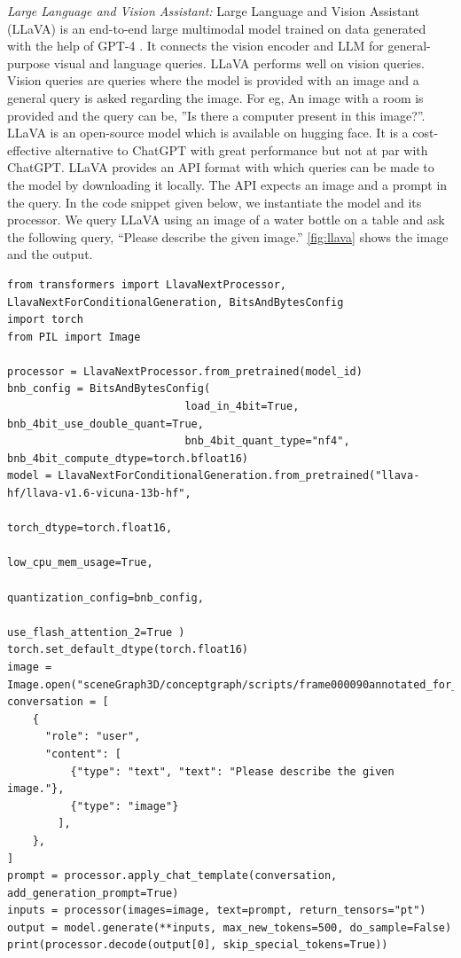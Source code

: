 \textit{Large Language and Vision Assistant:}
 Large Language and Vision Assistant (LLaVA) is an end-to-end large multimodal model trained on data generated with the help of GPT-4 \cite{liu2023visualinstructiontuning}. 
 It connects the vision encoder and LLM for general-purpose visual and language queries. LLaVA performs well on vision queries. 
 Vision queries are queries where the model is provided with an image and a general query is asked regarding the image. 
 For eg, An image with a room is provided and the query can be, ”Is there a computer present in this image?”. LLaVA is an open-source model which is available on
 hugging face. It is a cost-effective alternative to ChatGPT with great performance but not at par with ChatGPT. LLaVA provides an API format with which queries can be made
 to the model by downloading it locally. The API expects an image and a prompt in the query. In the code snippet given below, we instantiate the model and its processor. We
 query LLaVA using an image of a water bottle on a table and ask the following query, \enquote{Please describe the given image.} \cref{fig:llava} shows the image
 and the output.  
\begin{lstlisting}
from transformers import LlavaNextProcessor, LlavaNextForConditionalGeneration, BitsAndBytesConfig
import torch
from PIL import Image

processor = LlavaNextProcessor.from_pretrained(model_id)
bnb_config = BitsAndBytesConfig(
                            load_in_4bit=True, bnb_4bit_use_double_quant=True,
                            bnb_4bit_quant_type="nf4", bnb_4bit_compute_dtype=torch.bfloat16)
model = LlavaNextForConditionalGeneration.from_pretrained("llava-hf/llava-v1.6-vicuna-13b-hf", 
                                                          torch_dtype=torch.float16, 
                                                          low_cpu_mem_usage=True, 
                                                          quantization_config=bnb_config,
                                                          use_flash_attention_2=True ) 
torch.set_default_dtype(torch.float16)
image = Image.open("sceneGraph3D/conceptgraph/scripts/frame000090annotated_for_vlm.jpg")
conversation = [
    {
      "role": "user",
      "content": [
          {"type": "text", "text": "Please describe the given image."},
          {"type": "image"}
        ],
    },
]
prompt = processor.apply_chat_template(conversation, add_generation_prompt=True)
inputs = processor(images=image, text=prompt, return_tensors="pt")
output = model.generate(**inputs, max_new_tokens=500, do_sample=False)
print(processor.decode(output[0], skip_special_tokens=True))
\end{lstlisting}

